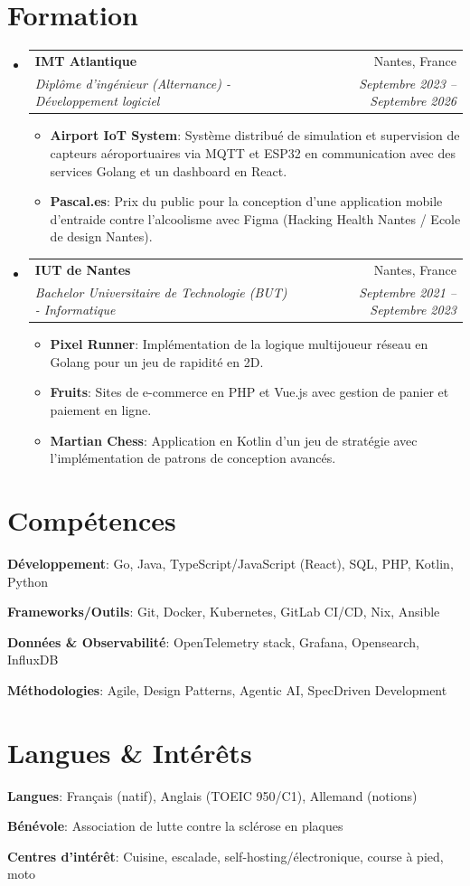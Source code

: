 \documentclass[letterpaper,11pt]{article}
\makeatletter
\newcommand{\resumeItem}[2]{
  \item\small{
    \begin{minipage}[t]{\dimexpr\linewidth-2em\relax}
    \textbf{#1}{: #2 \vspace{-2pt}}
    \end{minipage}
  }
}
\newcommand{\resumeIndentedLine}[2]{
  \noindent\hspace*{8pt}\parbox[t]{\dimexpr\linewidth-2em\relax}{\textbf{#1}: #2\vspace{2pt}}
}
\newcommand{\resumeSubheading}[4]{
  \vspace{-1pt}\item
    \begin{tabular*}{0.97\textwidth}[t]{l@{\extracolsep{\fill}}r}
      \textbf{#1} & #2 \\
      \textit{\small #3} & \textit{\small #4} \\
    \end{tabular*}\vspace{-6pt}
}
\newcommand{\resumeSubHeadingListStart}{\begin{itemize}[leftmargin=*]}
\newcommand{\resumeSubHeadingListEnd}{\end{itemize}}
\newcommand{\resumeItemListStart}{\begin{itemize}}
\newcommand{\resumeItemListEnd}{\end{itemize}\vspace{-6pt}}
\makeatother
\begin{document}
\section{Formation}
  \resumeSubHeadingListStart
    \resumeSubheading
      {IMT Atlantique}{Nantes, France}
      {Diplôme d'ingénieur (Alternance) - Développement logiciel}{Septembre 2023 -- Septembre 2026}
      \resumeItemListStart
        \resumeItem{Airport IoT System}{Système distribué de simulation et supervision de capteurs aéroportuaires via MQTT et ESP32 en communication avec des services Golang et un dashboard en React.}
        \resumeItem{Pascal.es}{Prix du public pour la conception d'une application mobile d'entraide contre l'alcoolisme avec Figma (Hacking Health Nantes / Ecole de design Nantes).}
      \resumeItemListEnd
    \resumeSubheading
      {IUT de Nantes}{Nantes, France}
      {Bachelor Universitaire de Technologie (BUT) - Informatique}{Septembre 2021 -- Septembre 2023}
      \resumeItemListStart
        \resumeItem{Pixel Runner}{Implémentation de la logique multijoueur réseau en Golang pour un jeu de rapidité en 2D.}
        \resumeItem{Fruits}{Sites de e-commerce en PHP et Vue.js avec gestion de panier et paiement en ligne.}
        \resumeItem{Martian Chess}{Application en Kotlin d'un jeu de stratégie avec l'implémentation de patrons de conception avancés.}
      \resumeItemListEnd
    \resumeSubHeadingListEnd

\noindent
\begin{minipage}[t]{0.48\textwidth}
\raggedright
\section{Compétences}
\small{
\resumeIndentedLine{Développement}{Go, Java, TypeScript/JavaScript (React), SQL, PHP, Kotlin, Python}
\resumeIndentedLine{Frameworks/Outils}{Git, Docker, Kubernetes, GitLab CI/CD, Nix, Ansible}
\resumeIndentedLine{Données \& Observabilité}{OpenTelemetry stack, Grafana, Opensearch, InfluxDB}
\resumeIndentedLine{Méthodologies}{Agile, Design Patterns, Agentic AI, SpecDriven Development}
}
\end{minipage}
\hfill
\begin{minipage}[t]{0.48\textwidth}
\raggedright
\section{Langues \& Intérêts}
\small{
\resumeIndentedLine{Langues}{Français (natif), Anglais (TOEIC 950/C1), Allemand (notions)}
\resumeIndentedLine{Bénévole}{Association de lutte contre la sclérose en plaques}
\resumeIndentedLine{Centres d'intérêt}{Cuisine, escalade, self-hosting/électronique, course à pied, moto}
}
\end{minipage}
\end{document}
